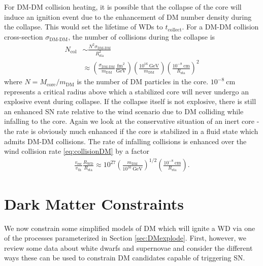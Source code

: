 \documentclass[twocolumn, preprintnumbers,amsmath,amssymb,prd, superscriptaddress]{revtex4}
\newcommand{\GeV}{\text{GeV}}
\def\r{\right)}
\def\l{\left(}
\begin{document}
For DM-DM collision heating, it is possible that the collapse of the core will induce an ignition event due to the enhancement of DM number density during the collapse.
This would set the lifetime of WDs to $t_\text{collect}$.
For a DM-DM collision cross-section $\sigma_\text{DM-DM}$, the number of collisions during the collapse is
\begin{align}
  N_\text{col} &\sim \frac{N^2 \sigma_\text{DM-DM}}{R_\text{sta}^2} \\
  &\approx \l \frac{\sigma_\text{DM-DM}}{m_\text{DM}}
  \frac{\text{fm}^2}{\GeV} \r
  \l \frac{10^{16}~\GeV}{m_\text{DM}} \r
  \l \frac{10^{-8}~\text{cm}}{R_\text{sta}} \r^2 \nonumber
\end{align}
where $N = M_\text{core}/m_\text{DM}$ is the number of DM particles in the core.
$10^{-8}~\text{cm}$ represents a critical radius above which a stabilized core will never undergo an explosive event during collapse.
If the collapse itself is not explosive, there is still an enhanced SN rate relative to the wind scenario due to DM colliding while infalling to the core. Again we look at the conservative situation of an inert core - the rate is obviously much enhanced if the core is stabilized in a fluid state which admits DM-DM collisions.
The rate of infalling collisions is enhanced over the wind collision rate \eqref{eq:collisionDM} by a factor
\begin{align}
  \frac{v_\text{esc}}{v_\text{th}} \frac{R_\text{WD}}{R_\text{sta}}
  \approx 10^{27} \l \frac{m_\text{DM}}{10^{16}~\GeV} \r^{1/2}
  \l \frac{10^{-8}~\text{cm}}{R_\text{sta}} \r.
\end{align}


\section{Dark Matter Constraints}
\label{sec:Constraints}

We now constrain some simplified models of DM which will ignite a WD via one of the processes parameterized in Section \ref{sec:DMexplode}.
First, however, we review some data about white dwarfs and supernovae and consider the different ways these can be used to constrain DM candidates capable of triggering SN.
\end{document}
